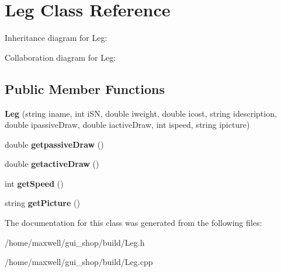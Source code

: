 \hypertarget{classLeg}{}\section{Leg Class Reference}
\label{classLeg}


Inheritance diagram for Leg\+:


Collaboration diagram for Leg\+:
\subsection*{Public Member Functions}
\begin{DoxyCompactItemize}
\item 
{\bfseries Leg} (string iname, int i\+SN, double iweight, double icost, string idescription, double ipassive\+Draw, double iactive\+Draw, int ispeed, string ipicture)\hypertarget{classLeg_a08e3e7bb8a32835913e0422673615e92}{}\label{classLeg_a08e3e7bb8a32835913e0422673615e92}

\item 
double {\bfseries getpassive\+Draw} ()\hypertarget{classLeg_ae3741d64a389905d71ae63c9624eb1e7}{}\label{classLeg_ae3741d64a389905d71ae63c9624eb1e7}

\item 
double {\bfseries getactive\+Draw} ()\hypertarget{classLeg_a92cfd191901e713814b08e54ef710cc1}{}\label{classLeg_a92cfd191901e713814b08e54ef710cc1}

\item 
int {\bfseries get\+Speed} ()\hypertarget{classLeg_a43c5c6614c93691eeaee88d9c47a45cd}{}\label{classLeg_a43c5c6614c93691eeaee88d9c47a45cd}

\item 
string {\bfseries get\+Picture} ()\hypertarget{classLeg_a64d88db0247a536dc2e82c645b8cdc27}{}\label{classLeg_a64d88db0247a536dc2e82c645b8cdc27}

\end{DoxyCompactItemize}


The documentation for this class was generated from the following files\+:\begin{DoxyCompactItemize}
\item 
/home/maxwell/gui\+\_\+shop/build/Leg.\+h\item 
/home/maxwell/gui\+\_\+shop/build/Leg.\+cpp\end{DoxyCompactItemize}
